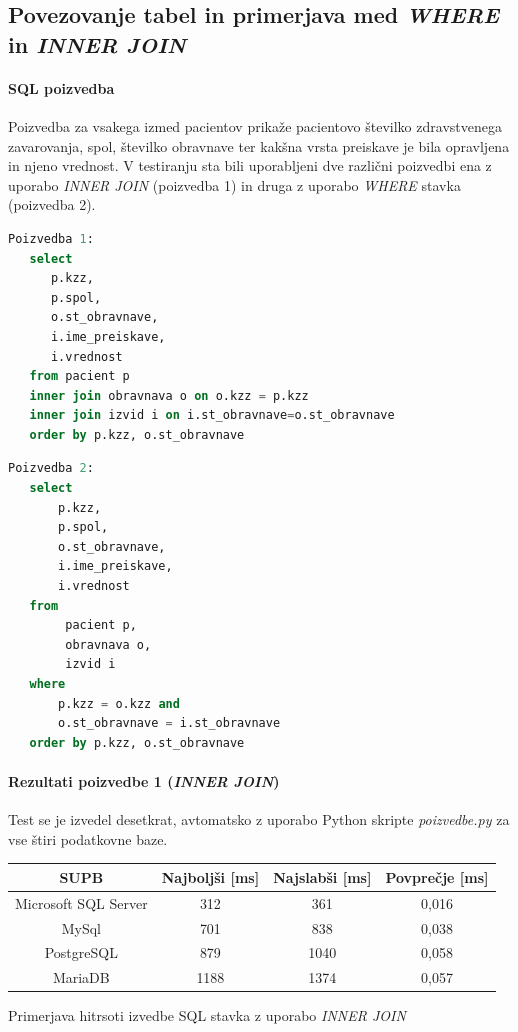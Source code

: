 \documentclass[a4paper,11pt]{report}
\begin{document}
\subsection{Povezovanje tabel in primerjava med \textit{WHERE} in \textit{INNER JOIN}}

\paragraph{SQL poizvedba}
Poizvedba za vsakega izmed pacientov prikaže pacientovo številko zdravstvenega zavarovanja, spol, številko obravnave
ter kakšna vrsta preiskave je bila opravljena in njeno vrednost. V testiranju sta bili uporabljeni dve različni poizvedbi
ena z uporabo \textit{INNER JOIN} (poizvedba 1) in druga z uporabo \textit{WHERE} stavka (poizvedba 2).
\begin{lstlisting}[language = SQL]
Poizvedba 1:
   select
      p.kzz,
      p.spol,
      o.st_obravnave,
      i.ime_preiskave,
      i.vrednost
   from pacient p
   inner join obravnava o on o.kzz = p.kzz
   inner join izvid i on i.st_obravnave=o.st_obravnave
   order by p.kzz, o.st_obravnave
\end{lstlisting}
\pagebreak
\begin{lstlisting}[language = SQL]
Poizvedba 2:
   select
       p.kzz,
       p.spol,
       o.st_obravnave,
       i.ime_preiskave,
       i.vrednost
   from
        pacient p,
        obravnava o,
        izvid i
   where
       p.kzz = o.kzz and
       o.st_obravnave = i.st_obravnave
   order by p.kzz, o.st_obravnave
\end{lstlisting}

\paragraph{Rezultati poizvedbe 1 (\textit{INNER JOIN})}
Test se je izvedel desetkrat, avtomatsko z uporabo Python skripte \textit{poizvedbe.py} za vse štiri podatkovne baze.

\begin{center}
   \begin{tabular}{||c|c|c|c||}
      \hline
      \textbf{SUPB} & \textbf{Najboljši [ms]} & \textbf{Najslabši [ms]} & \textbf{Povprečje [ms]}\\
      \hline
      \hline
      Microsoft SQL Server & 312 & 361 & 0,016 \\
      MySql & 701 & 838 & 0,038 \\
      PostgreSQL & 879 & 1040 & 0,058\\
      MariaDB & 1188 & 1374 & 0,057 \\
      \hline
   \end{tabular}
\end{center}
Primerjava hitrsoti izvedbe SQL stavka z uporabo \textit{INNER JOIN}
\end{document}
